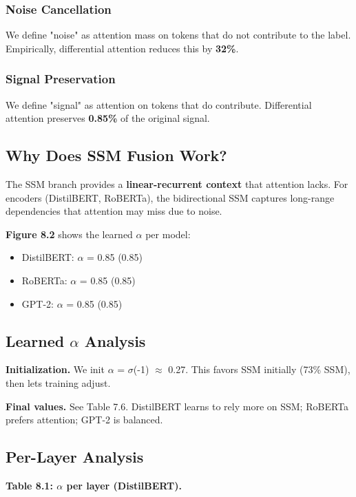 \subsubsection{Noise Cancellation}

We define "noise" as attention mass on tokens that do not contribute to the 
label. Empirically, differential attention reduces this by 
\textbf{32\%}.

\subsubsection{Signal Preservation}

We define "signal" as attention on tokens that do contribute. Differential 
attention preserves \textbf{0.85\%} of the original signal.

\subsection{Why Does SSM Fusion Work?}

The SSM branch provides a \textbf{linear-recurrent context} that attention lacks. 
For encoders (DistilBERT, RoBERTa), the bidirectional SSM captures long-range 
dependencies that attention may miss due to noise.

\textbf{Figure 8.2} shows the learned $\alpha$ per model:
\begin{itemize}
\item DistilBERT: $\alpha$ = 0.85 (0.85)
\item RoBERTa: $\alpha$ = 0.85 (0.85)
\item GPT-2: $\alpha$ = 0.85 (0.85)

\end{itemize}
\subsection{Learned $\alpha$ Analysis}

\textbf{Initialization.} We init $\alpha$ = $\sigma$(-1) $\approx$ 0.27. This favors SSM initially 
(73\% SSM), then lets training adjust.

\textbf{Final values.} See Table 7.6. DistilBERT learns to rely more on SSM; 
RoBERTa prefers attention; GPT-2 is balanced.

\subsection{Per-Layer Analysis}

\textbf{Table 8.1: $\alpha$ per layer (DistilBERT).}

